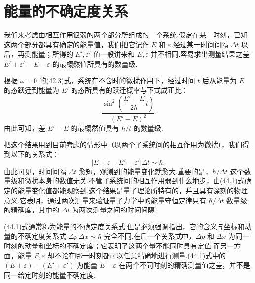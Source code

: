 \section{能量的不确定度关系}

我们来考虑由相互作用很弱的两个部分所组成的一个系统.假定在某一时刻，已知这两个部分都具有确定的能量值，我们把它记作 $E$ 和 $\varepsilon$.经过某一时间间隔 $\Delta t$ 以后，再测能量；所得的 $E',\varepsilon'$ 值一般讲来和 $E,\varepsilon$ 并不相同.容易求出测量结果之差 $E'+\varepsilon'-E-\varepsilon$ 的最概然值所具有的数量级.

根据 $\omega=0$ 的(42.3)式，系统在不含时的微扰作用下，经过时间 $t$ 后从能量为 $E$ 的态跃迁到能量为 $E'$ 的态所具有的跃迁概率与下式成正比：
\begin{equation*}
  \frac{\sin^2\left(\dfrac{E'-E}{2\hbar}\,t\right)}{\left(E'-E\right)^2}
\end{equation*}
由此可知，差 $E'-E$ 的最概然值具有 $\hbar/t$ 的数量级.

把这个结果用到目前考虑的情形中（以两个子系统间的相互作用为微扰），我们得到以下的关系式：
\begin{equation}
  \left|E+\varepsilon-E'-\varepsilon'\right|\Delta t\sim\hbar.
\end{equation}
由此可见，时间间隔 $\Delta t$ 愈短，观测到的能量变化就愈大.重要的是，$\hbar/\Delta t$ 这个数量级和微扰本身的数值无关.不管子系统间的相互作用弱到什么地步，由(44.1)式确定的能量变化值都能观察到.这个结果是量子理论所特有的，并且具有深刻的物理意义.它表明，通过两次测量来验证量子力学中的能量守恒定律只有 $\hbar/\Delta t$ 数量级的精确度，其中的 $\Delta t$ 为两次测量之间的时间间隔.

(44.1)式通常称为能量的不确定度关系式.但是必须强调指出，它的含义与坐标和动量的不确定度关系式 $\Delta p\,\Delta x\sim\hbar$ 完全不同.在后一个关系式中，$\Delta p$ 和 $\Delta x$ 为同一时刻的动量和坐标的不确定度；它表明了这两个量不能同时具有定值.而另一方面，能量 $E,\varepsilon$ 却不论在哪一时刻都可以任意精确地进行测量.(44.1)式中的 $\left(E+\varepsilon\right)-\left(E'+\varepsilon'\right)$ 为能量 $E+\varepsilon$ 在两个不同时刻的精确测量值之差，并不是同一给定时刻的能量不确定度.

